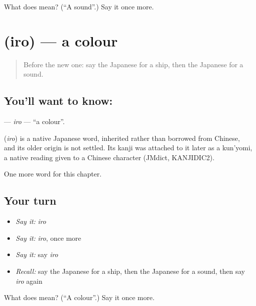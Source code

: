 \begin{tcolorbox}[breakable,colback=teal!4,colframe=teal!35!black,title={Before you move on}]
What does  mean? (\textquotedblleft{}A sound\textquotedblright{}.) Say it once more.
\end{tcolorbox}
\section[\texorpdfstring{\ja{いろ} (iro)}{いろ (iro)}]{ (iro) — a colour}

\label{lesson:JA-C62-iro}



\begin{quote}
Before the new one: say the Japanese for a ship, then the Japanese for a sound.
\end{quote}

\subsection*{You'll want to know: }
\textbf{} — \emph{iro} — \textquotedblleft{}a colour\textquotedblright{}.

\begin{cousinweb}
\textbf{} (\emph{iro}) is a native Japanese word, inherited rather than borrowed from Chinese, and its older origin is not settled. Its kanji was attached to it later as a kun'yomi, a native reading given to a Chinese character (JMdict, KANJIDIC2).
\end{cousinweb}

\begin{grammarlens}[title={What you've built}]
One more word for this chapter.
\end{grammarlens}

\subsection*{Your turn}
\begin{itemize}
\raggedright
  \item \emph{Say it:} \emph{iro}
  \item \emph{Say it:} \emph{iro}, once more
  \item \emph{Say it:} say \emph{iro}
  \item \emph{Recall:} say the Japanese for a ship, then the Japanese for a sound, then say \emph{iro} again
\end{itemize}

\begin{tcolorbox}[breakable,colback=teal!4,colframe=teal!35!black,title={Before you move on}]
What does  mean? (\textquotedblleft{}A colour\textquotedblright{}.) Say it once more.
\end{tcolorbox}
